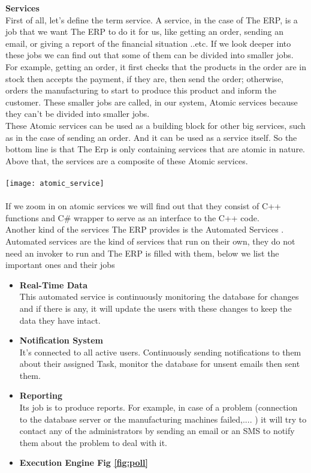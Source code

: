 \begin{adjustwidth}{2cm}{}
    \textbf{Services}\\
        First of all, let’s define the term service. A service, in the case of The ERP, is a job that we
want The ERP to do it for us, like getting an order, sending an email, or giving a report of the
financial situation ..etc.
If we look deeper into these jobs we can find out that some of them can be divided into
smaller jobs. For example, getting an order, it first checks that the products in the order are in
stock then accepts the payment, if they are, then send the order; otherwise, orders the
manufacturing to start to produce this product and inform the customer.
These smaller jobs are called, in our system, Atomic services because they can’t be divided
into smaller jobs.\\
These Atomic services can be used as a building block for other big services, such as in the
case of sending an order. And it can be used as a service itself. So the bottom line is that The
Erp is only containing services that are atomic in nature.
Above that, the services are a composite of these Atomic services.\\\\
\texttt{[image: atomic\_service]}\\\\
If we zoom in on atomic services we will find out that they consist of C++ functions and C\#
wrapper to serve as an interface to the C++ code.\\
Another kind of the services The ERP provides is the Automated Services .
Automated services are the kind of services that run on their own, they do not need an invoker
to run and The ERP is filled with them, below we list the important ones and their jobs\\
\linebreak
\begin{itemize}
    \item \textbf{Real-Time Data}\\ This automated service is continuously monitoring the database for changes and if there is
    any, it will update the users with these changes to keep the data they have intact.\\
    \item \textbf{Notification System}\\ It’s connected to all active users. Continuously sending notifications to them about their
    assigned Task, monitor the database for unsent emails then sent them.\\
    \item \textbf{Reporting}\\ Its job is to produce reports. For example, in case of a problem (connection to the database
    server or the manufacturing machines failed,.... ) it will try to contact any of the
    administrators by sending an email or an SMS to notify them about the problem to deal with
    it.\\
    \item \textbf{Execution Engine Fig \ref{fig:poll}}\\
    

\end{itemize}
\end{adjustwidth}
